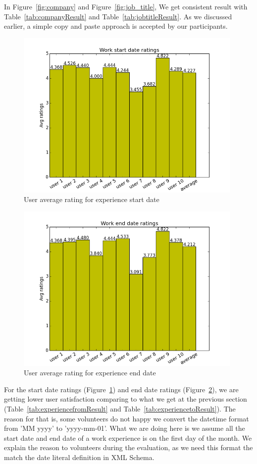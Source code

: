 In Figure~\ref{fig:company} and Figure~\ref{fig:job_title}, We get consistent result with Table~\ref{tab:companyResult} and Table~\ref{tab:jobtitleResult}. As we discussed earlier, a simple copy and paste approach is accepted by our participants.

\begin{figure}[H]
\centering
\includegraphics[width=110mm]{images/evaluation/average_experience_start_date_score.png}
\caption{User average rating for experience start date}
\label{fig:experiencestart}
\end{figure}

\begin{figure}[H]
\centering
\includegraphics[width=110mm]{images/evaluation/average_experience_end_date_score.png}
\caption{User average rating for experience end date}
\label{fig:experienceend}
\end{figure}

For the start date ratings (Figure~\ref{fig:experiencestart}) and end date ratings (Figure~\ref{fig:experienceend}), we are getting lower user satisfaction comparing to what we get at the previous section (Table~\ref{tab:experiencefromResult} and Table~\ref{tab:experiencetoResult}). The reason for that is, some volunteers do not happy we convert the datetime format from 'MM yyyy' to 'yyyy-mm-01'. What we are doing here is we assume all the start date and end date of a work experience is on the first day of the month. We explain the reason to volunteers during the evaluation, as we need this format the match the date literal definition in XML Schema\cite{biron2004xml}.

